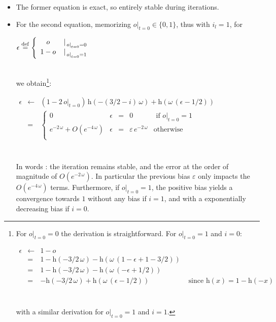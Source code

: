 \documentclass[a4]{article} \usepackage[left=2cm,right=3cm,top=1cm,bottom=2cm]{geometry}
\newcommand{\eqline}[1]{~\vspace{0.1cm}\\\centerline{$#1$}\vspace{0.1cm}\\}
\newcommand{\defq}{\stackrel {\rm def}{=}}
\begin{document}
\begin{itemize}
  \item The former equation is exact, so entirely stable during iterations.
 \item For the second equation, memorizing $\left.o\right|_{t=0} \in \{0, 1 \}$, thus with $i_l = 1$, for
\eqline{\epsilon \defq \left\{\begin{array}{cc} o &\left.\right|_{\left.o\right|_{t=0} = 0} \\ 1 - o&\left.\right|_{\left.o\right|_{t=0} = 1} \end{array} \right.}
we obtain\footnote{
For $\left.o\right|_{t=0} = 0$ the derivation is straightforward. For $\left.o\right|_{t=0} = 1$ and $i = 0$:
\eqline{\begin{array}{rcll}
    \epsilon
    &\leftarrow& 1 - o \\
    &=& 1 - \mbox{h}(-3/2 \, \omega) - \mbox{h}( \omega \, (1 - \epsilon + 1 - 3/2)) \\
    &=& 1 - \mbox{h}(-3/2 \, \omega) - \mbox{h}( \omega \, (-\epsilon + 1/2)) \\
    &=& - \mbox{h}(-3/2 \, \omega) + \mbox{h}(\omega \, (\epsilon - 1/2)) & \mbox{ since $\mbox{h}(x) = 1 - \mbox{h}(-x)$} \\
  \end{array}} with a similar derivation for $\left.o\right|_{t=0} = 1$ and $i = 1$.}:
\eqline{\begin{array}{rcl}
    \epsilon &\leftarrow& (1 - 2 \, \left.o\right|_{t=0}) \,  \mbox{h}(-(3/2 - i) \, \omega) + \mbox{h}( \omega \, (\epsilon - 1/2)) \\
    &=& \left\{\begin{array}{lrcll}
      0 &\epsilon&=& 0 & \mbox{ if $\left.o\right|_{t=0} = 1$}\\
      e^{-2 \, \omega} + O\left(e^{-4 \, \omega}\right) &\epsilon&=& \varepsilon \, e^{-2 \, \omega}& \mbox{otherwise}\\
   \end{array}\right. \\
\end{array}}
In words : the iteration remains stable, and the error at the order of magnitude of $O\left(e^{-2 \, \omega}\right)$. In particular the previous bias $\varepsilon$ only impacts the $O\left(e^{-4 \, \omega}\right)$ terms. Furthermore, if $\left.o\right|_{t=0} = 1$, the positive bias yields a convergence towards $1$ without any bias if $i = 1$, and with a exponentially decreasing bias if 
$i = 0$.


\end{itemize}
\end{document}
